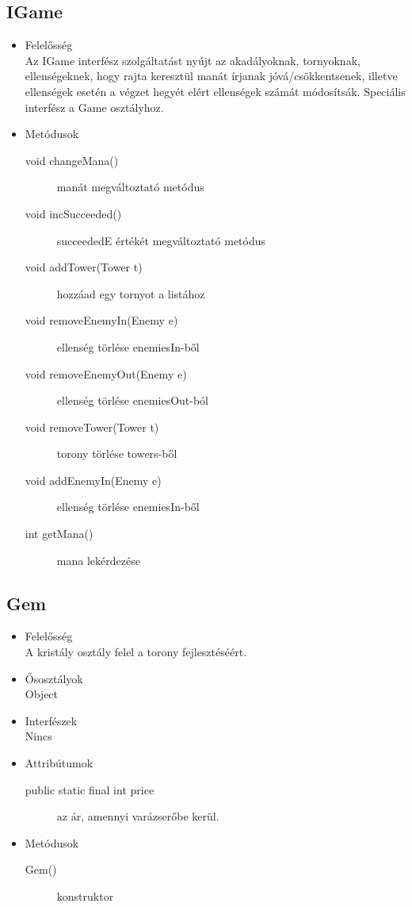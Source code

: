		
	
\subsection{IGame}
\begin{itemize}
\item Felelősség\\
Az IGame interfész szolgáltatást nyújt az akadályoknak, tornyoknak, ellenségeknek, hogy rajta keresztül manát írjanak jóvá/csökkentsenek, illetve ellenségek esetén a végzet hegyét elért ellenségek számát módosítsák. Speciális interfész a Game osztályhoz. 

\item Metódusok\\
	\begin{description}
		\item[void changeMana()] manát megváltoztató metódus
\item[void incSucceeded()] succeededE értékét megváltoztató metódus
\item[void addTower(Tower t)] hozzáad egy tornyot a listához
\item[void removeEnemyIn(Enemy e)] ellenség törlése enemiesIn-ből
\item[void removeEnemyOut(Enemy e)] ellenség törlése enemiesOut-ból
\item[void removeTower(Tower t)] torony törlése towers-ből
\item[void addEnemyIn(Enemy e)] ellenség törlése enemiesIn-ből
\item[int getMana()] mana lekérdezése

		
	\end{description}
\end{itemize}

\subsection{Gem}
\begin{itemize}
\item Felelősség\\
A kristály osztály felel a torony fejlesztéséért.
\item Ősosztályok\\
Object
\item Interfészek\\
Nincs
\item Attribútumok\\
	\begin{description}
		\item[public static final int price] az ár, amennyi varázserőbe kerül.
	\end{description}
\item Metódusok\\
	\begin{description}
		
		\item[Gem()] konstruktor
		
		
	\end{description}
\end{itemize}

